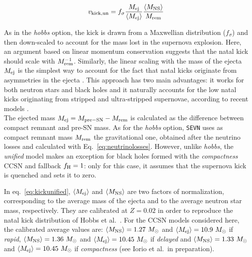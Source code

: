 \documentclass[a4paper,titlepage]{book}     	%
\newcommand{\sun}{\ensuremath{_\odot}}
\newcommand{\msun}{\ensuremath{M\sun}}
\begin{document}
\begin{equation}\label{eq:kickunified}
    v_{\rm kick, un} = f_{\sigma} \frac{M_{\rm ej}}{\langle M_{\rm ej}\rangle} \frac{\langle M_{\rm NS}\rangle}{M_{\rm rem}}
\end{equation}


As in the \emph{hobbs} option, the kick is drawn from a Maxwellian distribution ($f_{\sigma}$) and then down-scaled to account for the mass lost in the supernova explosion. Here, an argument based on linear momentum conservation suggests that the natal kick should scale with $M_{\rm rem}^{-1}$. Similarly, the linear scaling with the mass of the ejecta $M_{\rm ej}$ is the simplest way to account for the fact that natal kicks originate from asymmetries in the ejecta \cite{BrayEldridge2016_natalkicksunified}. This approach has two main advantages: it works for both neutron stars and black holes and it naturally accounts for the low natal kicks originating from stripped and ultra-stripped supernovae, according to recent models \cite{tauris2017_formationnatalkicks}.\\

The ejected mass $M_{\rm ej} = M_{\rm pre-SN} - M_{\rm rem}$ is calculated as the difference between compact remnant and pre-SN mass. As for the \emph{hobbs} option, \texttt{SEVN} uses as compact remnant mass $M_{\rm rem}$ the gravitational one, obtained after the neutrino losses and calculated with Eq.\ \ref{eq:neutrinolosses}. However, unlike \emph{hobbs}, the \emph{unified} model makes an exception for black holes formed with the \emph{compactness} CCSN and fallback $f_{\rm H}=1$: only for this case, it assumes that the supernova kick is quenched and sets it to zero.

In eq.~\ref{eq:kickunified}, $\langle{}M_{\rm ej}\rangle{}$ and $\langle{}M_{\rm NS}\rangle{}$ are two factors of normalization, corresponding to the average mass of the ejecta and to the average neutron star mass, respectively. They are calibrated at $Z=0.02$ in order to reproduce the natal kick distribution of Hobbs et al.\ \cite{Hobbs2005}. For the CCSN models considered here, the calibrated average values are: $\langle M_{\rm NS}\rangle = 1.27~\msun$ and $\langle M_{\rm ej}\rangle = 10.9~\msun$ if \emph{rapid}, $\langle M_{\rm NS}\rangle = 1.36~\msun$ and $\langle M_{\rm ej}\rangle = 10.45~\msun$ if \emph{delayed} and $\langle M_{\rm NS}\rangle = 1.33~\msun$ and $\langle M_{\rm ej}\rangle = 10.45~\msun$ if \emph{compactness} (see Iorio et al.\ in preparation).
\end{document}
